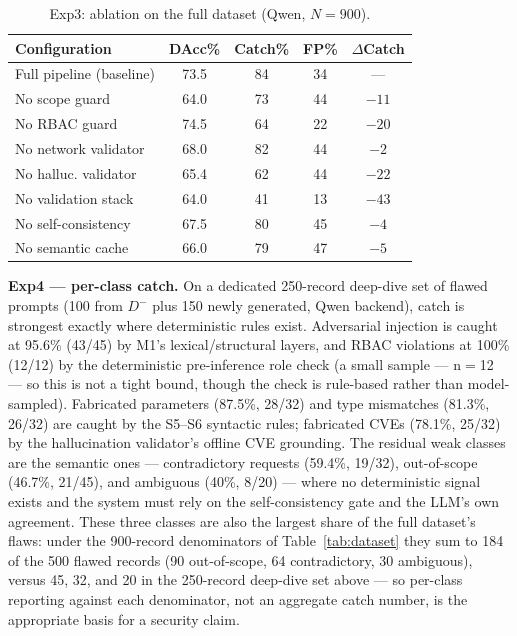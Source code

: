 \documentclass[conference]{IEEEtran}
\begin{document}
\begin{table}[!t]
\centering
\caption{Exp3: ablation on the full dataset (Qwen, $N{=}900$).}
\label{tab:exp3}
\setlength{\tabcolsep}{4pt}
\small
\begin{tabular}{@{}lcccc@{}}
\toprule
\textbf{Configuration} & \textbf{DAcc\%} & \textbf{Catch\%} & \textbf{FP\%} & $\Delta$Catch \\
\midrule
Full pipeline (baseline) & 73.5 & 84 & 34 & --- \\
No scope guard           & 64.0 & 73 & 44 & $-11$ \\
No RBAC guard            & 74.5 & 64 & 22 & $-20$ \\
No network validator     & 68.0 & 82 & 44 & $-2$ \\
No halluc. validator     & 65.4 & 62 & 44 & $-22$ \\
No validation stack      & 64.0 & 41 & 13 & $-43$ \\
No self-consistency      & 67.5 & 80 & 45 & $-4$ \\
No semantic cache        & 66.0 & 79 & 47 & $-5$ \\
\bottomrule
\end{tabular}
\end{table}

\textbf{Exp4 --- per-class catch.} On a dedicated 250-record deep-dive set of flawed prompts (100 from $D^-$ plus 150 newly generated, Qwen backend), catch is strongest exactly where deterministic rules exist. Adversarial injection is caught at 95.6\% (43/45) by M1's lexical/structural layers, and RBAC violations at 100\% (12/12) by the deterministic pre-inference role check (a small sample --- n${=}$12 --- so this is not a tight bound, though the check is rule-based rather than model-sampled). Fabricated parameters (87.5\%, 28/32) and type mismatches (81.3\%, 26/32) are caught by the S5--S6 syntactic rules; fabricated CVEs (78.1\%, 25/32) by the hallucination validator's offline CVE grounding. The residual weak classes are the semantic ones --- contradictory requests (59.4\%, 19/32), out-of-scope (46.7\%, 21/45), and ambiguous (40\%, 8/20) --- where no deterministic signal exists and the system must rely on the self-consistency gate and the LLM's own agreement. These three classes are also the largest share of the full dataset's flaws: under the 900-record denominators of Table~\ref{tab:dataset} they sum to 184 of the 500 flawed records (90 out-of-scope, 64 contradictory, 30 ambiguous), versus 45, 32, and 20 in the 250-record deep-dive set above --- so per-class reporting against each denominator, not an aggregate catch number, is the appropriate basis for a security claim.
\end{document}
